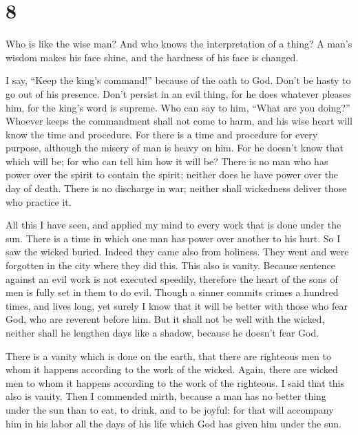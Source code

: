 \hypertarget{section-7}{%
\section{8}\label{section-7}}

 Who is like the wise man? And who knows the interpretation
of a thing? A man's wisdom makes his face shine, and the hardness of his
face is changed.

 I say, ``Keep the king's command!'' because of the oath to
God.  Don't be hasty to go out of his presence. Don't
persist in an evil thing, for he does whatever pleases him, 
for the king's word is supreme. Who can say to him, ``What are you
doing?''  Whoever keeps the commandment shall not come to
harm, and his wise heart will know the time and procedure. 
For there is a time and procedure for every purpose, although the misery
of man is heavy on him.  For he doesn't know that which will
be; for who can tell him how it will be?  There is no man
who has power over the spirit to contain the spirit; neither does he
have power over the day of death. There is no discharge in war; neither
shall wickedness deliver those who practice it.

 All this I have seen, and applied my mind to every work
that is done under the sun. There is a time in which one man has power
over another to his hurt.  So I saw the wicked buried.
Indeed they came also from holiness. They went and were forgotten in the
city where they did this. This also is vanity.  Because
sentence against an evil work is not executed speedily, therefore the
heart of the sons of men is fully set in them to do evil. 
Though a sinner commits crimes a hundred times, and lives long, yet
surely I know that it will be better with those who fear God, who are
reverent before him.  But it shall not be well with the
wicked, neither shall he lengthen days like a shadow, because he doesn't
fear God.

 There is a vanity which is done on the earth, that there
are righteous men to whom it happens according to the work of the
wicked. Again, there are wicked men to whom it happens according to the
work of the righteous. I said that this also is vanity. 
Then I commended mirth, because a man has no better thing under the sun
than to eat, to drink, and to be joyful: for that will accompany him in
his labor all the days of his life which God has given him under the
sun.

